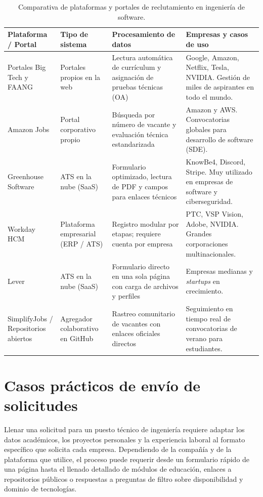 \documentclass[12pt]{article}
\begin{document}
\begin{table}[htbp]
    \centering
    \small
    \caption{Comparativa de plataformas y portales de reclutamiento en ingeniería de software.}
    \label{tab:comparativaPlataformas}
    \begin{tabularx}{\textwidth}{p{3.2cm} p{2.6cm} p{3.4cm} X}
        \toprule
        \textbf{Plataforma / Portal} & \textbf{Tipo de sistema} & \textbf{Procesamiento de datos} & \textbf{Empresas y casos de uso} \\
        \midrule
        Portales Big Tech y FAANG & Portales propios en la web & Lectura automática de currículum y asignación de pruebas técnicas (OA) & Google, Amazon, Netflix, Tesla, NVIDIA. Gestión de miles de aspirantes en todo el mundo. \\
        \addlinespace
        Amazon Jobs & Portal corporativo propio & Búsqueda por número de vacante y evaluación técnica estandarizada & Amazon y AWS. Convocatorias globales para desarrollo de software (SDE). \\
        \addlinespace
        Greenhouse Software & ATS en la nube (SaaS) & Formulario optimizado, lectura de PDF y campos para enlaces técnicos & KnowBe4, Discord, Stripe. Muy utilizado en empresas de software y ciberseguridad. \\
        \addlinespace
        Workday HCM & Plataforma empresarial (ERP / ATS) & Registro modular por etapas; requiere cuenta por empresa & PTC, VSP Vision, Adobe, NVIDIA. Grandes corporaciones multinacionales. \\
        \addlinespace
        Lever & ATS en la nube (SaaS) & Formulario directo en una sola página con carga de archivos y perfiles & Empresas medianas y \textit{startups} en crecimiento. \\
        \addlinespace
        SimplifyJobs / Repositorios abiertos & Agregador colaborativo en GitHub & Rastreo comunitario de vacantes con enlaces oficiales directos & Seguimiento en tiempo real de convocatorias de verano para estudiantes. \\
        \bottomrule
    \end{tabularx}
\end{table}

\section{Casos prácticos de envío de solicitudes}
\label{sec:casosPostulacion}

Llenar una solicitud para un puesto técnico de ingeniería requiere adaptar los datos académicos, los proyectos personales y la experiencia laboral al formato específico que solicita cada empresa. Dependiendo de la compañía y de la plataforma que utilice, el proceso puede requerir desde un formulario rápido de una página hasta el llenado detallado de módulos de educación, enlaces a repositorios públicos o respuestas a preguntas de filtro sobre disponibilidad y dominio de tecnologías.
\end{document}
